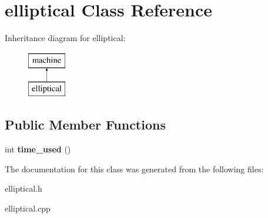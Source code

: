 \hypertarget{classelliptical}{\section{elliptical Class Reference}
\label{classelliptical}
}
Inheritance diagram for elliptical\-:\begin{figure}[H]
\begin{center}
\leavevmode
\includegraphics[height=2.000000cm]{classelliptical}
\end{center}
\end{figure}
\subsection*{Public Member Functions}
\begin{DoxyCompactItemize}
\item 
\hypertarget{classelliptical_a00cc443f8633d13f9b5a336b627d8cdf}{int {\bfseries time\-\_\-used} ()}\label{classelliptical_a00cc443f8633d13f9b5a336b627d8cdf}

\end{DoxyCompactItemize}


The documentation for this class was generated from the following files\-:\begin{DoxyCompactItemize}
\item 
elliptical.\-h\item 
elliptical.\-cpp\end{DoxyCompactItemize}
